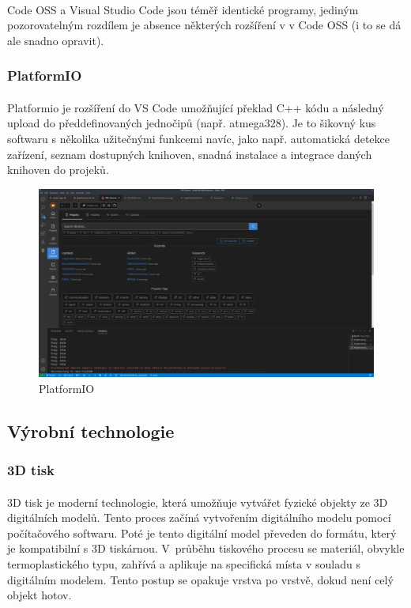 \documentclass[12pt]{article}
\begin{document}
\begin{spacing}{1.5}
	\paragraph{} Code OSS a Visual Studio Code jsou téměř identické programy, jediným pozorovatelným rozdílem je absence některých rozšíření v  v Code OSS (i to se dá ale snadno opravit).
	
	\subsubsection*{PlatformIO}
	\paragraph{} Platformio je rozšíření do VS Code umožňující překlad C++ kódu a následný upload do předdefinovaných jednočipů (např. atmega328). Je to šikovný kus softwaru s několika užitečnými funkcemi navíc, jako např. automatická detekce zařízení, seznam dostupných knihoven, snadná instalace a integrace daných knihoven do projeků.
	
	\begin{figure}[H]
		\centering
		\includegraphics[width=\linewidth]{platformio}
		\caption{PlatformIO}
		\label{fig:platformio}
	\end{figure}
	
	\newpage
	\subsection{Výrobní technologie}
	\subsubsection{3D tisk}
	\paragraph{} 3D tisk je moderní technologie, která umožňuje vytvářet fyzické objekty ze 3D digitálních modelů. Tento proces začíná vytvořením digitálního modelu pomocí počítačového softwaru. Poté je tento digitální model převeden do formátu, který je kompatibilní s 3D tiskárnou. V~průběhu tiskového procesu se materiál, obvykle termoplastického typu, zahřívá a aplikuje na specifická místa v souladu s digitálním modelem. Tento postup se opakuje vrstva po vrstvě, dokud není celý objekt hotov.
	

\end{spacing}
\end{document}
